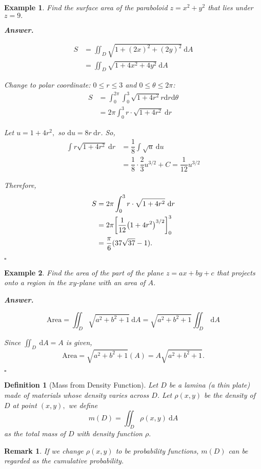 \documentclass[12pt,a4paper]{article}
\newtheorem{df}{Definition}[subsection]
\newtheorem{eg}{Example}[subsection]
\newenvironment*{ans}{\par\indent\textbf{\textit{Answer. }}\par}{\par\hfill{$\square$}\par}
\newtheorem*{rmk}{\indent Remark}
\def\dsst{\displaystyle}
\def\d{{\mathrm{d}}}
\def\dA{\d A}
\def\iintD{\dsst\iint_D}
\begin{document}
\begin{eg}
	Find the surface area of the paraboloid $z=x^2+y^2$ that lies under $z=9.$
	\begin{ans}
		\[\begin{aligned}S&=\iintD\sqrt{1+(2x)^2+(2y)^2}\ \dA\\&=\iintD\sqrt{1+4x^2+4y^2}\ \dA\end{aligned}\]\par Change to polar coordinate: $0\leq r\leq3$ and $0\leq\theta\leq2\pi$: \[\begin{aligned}S&=\int_0^{2\pi}\int_0^3\sqrt{1+4r^2}r\d r\d\theta\\&=2\pi\int_0^3r\cdot\sqrt{1+4r^2}\ \d r\end{aligned}\]\par Let $u=1+4r^2,$ so $\d u=8r\ \d r$. So, \[\begin{aligned}\int r\sqrt{1+4r^2}\ \d r&=\dfrac{1}{8}\int\sqrt{u}\ \d u\\&=\dfrac{1}{8}\cdot\dfrac{2}{3}u^{3/2}+C=\dfrac{1}{12}u^{3/2}\end{aligned}\]\par Therefore, \[\begin{aligned}S&=2\pi\int_0^3r\cdot\sqrt{1+4r^2}\ \d r\\&=2\pi\qty[\dfrac{1}{12}\qty(1+4r^2)^{3/2}]_0^3\\&=\dfrac{\pi}{6}(37\sqrt{37}-1).\end{aligned}\]
	\end{ans}
\end{eg}
\begin{eg}
	Find the area of the part of the plane $z=ax+by+c$ that projects onto a region in the $xy$-plane with an area of $A$.
	\begin{ans}
		\[\text{Area}=\iintD\sqrt{a^2+b^2+1}\ \dA=\sqrt{a^2+b^2+1}\iintD\ \dA\]\par Since $\iintD\ \dA=A$ is given, \[\text{Area}=\sqrt{a^2+b^2+1}(A)=A\sqrt{a^2+b^2+1}.\]
	\end{ans}	
\end{eg}
\begin{df}[Mass from Density Function]
	Let $D$ be a lamina (a thin plate) made of materials whose density varies across $D$. Let $\rho(x,y)$ be the density of $D$ at point $(x,y),$ we define \[m(D)=\iintD\rho(x,y)\ \dA\] as the total mass of $D$ with density function $\rho.$
\end{df}
\begin{rmk} If we change $\rho(x,y)$ to be probability functions, $m(D)$ can be regarded as the cumulative probability.\end{rmk}
\end{document}
